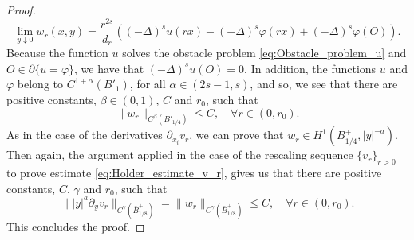 \documentclass[11pt,reqno]{amsart}
\theoremstyle{definition}
\theoremstyle{remark}
\begin{document}
\begin{proof}
$$
\lim_{y\downarrow 0} w_r(x,y)=\frac{r^{2s}}{d_r} \left((-\Delta)^s u(rx)-(-\Delta)^s \varphi(rx)+(-\Delta)^s \varphi(O)\right). 
$$
Because the function $u$ solves the obstacle problem \eqref{eq:Obstacle_problem_u} and $O\in\partial\{u=\varphi\}$, we have that $(-\Delta)^s u(O)=0$. In addition, the functions $u$ and $\varphi$ belong to $C^{1+\alpha}(B'_1)$, for all $\alpha\in (2s-1,s)$, and so, we see that there are positive constants, $\beta\in (0,1)$, $C$ and $r_0$, such that
\begin{equation*}
\|w_r\|_{C^{\beta}(B'_{1/4})} \leq C,\quad\forall r\in (0,r_0).
\end{equation*}
As in the case of the derivatives $\partial_{x_i} v_r$, we can prove that $w_r \in H^1(B^+_{1/4}, |y|^{-a})$. Then again, the argument applied in the case of the rescaling sequence $\{v_r\}_{r>0}$ to prove estimate \eqref{eq:Holder_estimate_v_r}, gives us that there are positive constants, $C$, $\gamma$ and $r_0$, such that
\begin{equation*}
\||y|^a\partial_y v_r\|_{C^{\gamma}(\bar B^+_{1/8})}=\|w_r\|_{C^{\gamma}(\bar B^+_{1/8})} \leq C,\quad\forall r\in (0,r_0).
\end{equation*}
This concludes the proof.
\end{proof}
\end{document}
